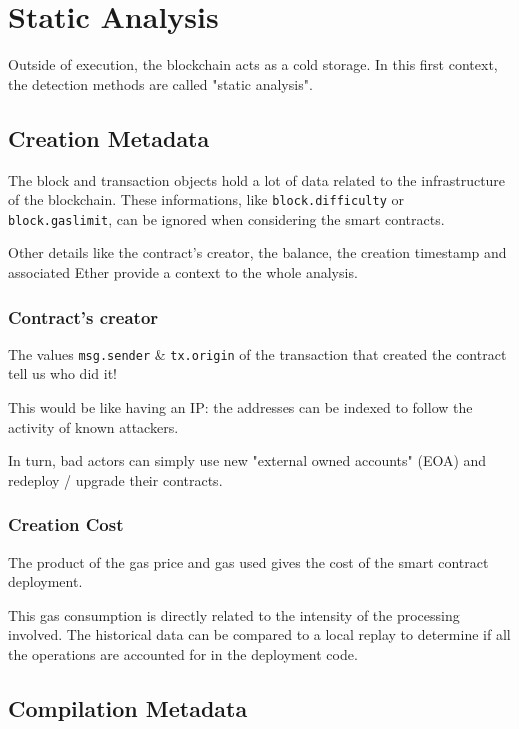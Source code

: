 \section{Static Analysis} \label{sec:data-static}

Outside of execution, the blockchain acts as a cold storage.
In this first context, the detection methods are called "static analysis".

\subsection{Creation Metadata}

The block and transaction objects hold a lot of data related to the infrastructure of the blockchain.
These informations, like \lstinline[language=Solidity]{block.difficulty} or \lstinline[language=Solidity]{block.gaslimit}, can be ignored when considering the smart contracts.

Other details like the contract's creator, the balance, the creation timestamp and associated Ether provide a context to the whole analysis.

\subsubsection{Contract's creator}

The values \lstinline[language=Solidity]{msg.sender} \& \lstinline[language=Solidity]{tx.origin} of the transaction that created the contract tell us who did it!

This would be like having an IP: the addresses can be indexed to follow the activity of known attackers.

In turn, bad actors can simply use new "external owned accounts" (EOA) and redeploy / upgrade their contracts.

\subsubsection{Creation Cost}

The product of the gas price and gas used gives the cost of the smart contract deployment.

This gas consumption is directly related to the intensity of the processing involved.
The historical data can be compared to a local replay to determine if all the operations are accounted for in the deployment code.

\subsection{Compilation Metadata}

